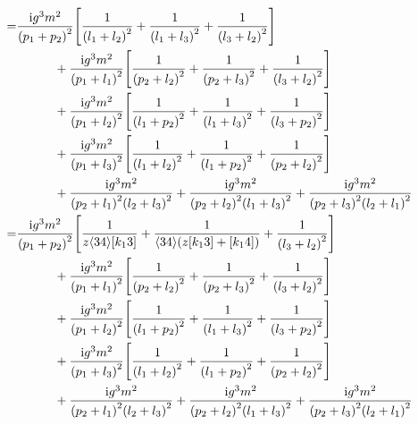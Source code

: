 \begin{align*}
    =&\frac{ \textnormal{i} g^3m^2}{\qty(p_1+p_2)^2}\qty[ \frac{1}{\qty(l_1+l_2)^2}+\frac{1}{\qty(l_1+l_3)^2}+\frac{1}{\qty(l_3+l_2)^2}]\\
    &\quad\quad\quad+\frac{ \textnormal{i} g^3m^2}{\qty(p_1+l_1)^2}\qty[ \frac{1}{\qty(p_2+l_2)^2}+\frac{1}{\qty(p_2+l_3)^2}+\frac{1}{\qty(l_3+l_2)^2}]\\
    &\quad\quad\quad+\frac{ \textnormal{i} g^3m^2}{\qty(p_1+l_2)^2}\qty[ \frac{1}{\qty(l_1+p_2)^2}+\frac{1}{\qty(l_1+l_3)^2}+\frac{1}{\qty(l_3+p_2)^2}]\\
    &\quad\quad\quad+\frac{ \textnormal{i} g^3m^2}{\qty(p_1+l_3)^2}\qty[ \frac{1}{\qty(l_1+l_2)^2}+\frac{1}{\qty(l_1+p_2)^2}+\frac{1}{\qty(p_2+l_2)^2}]\\
    &\quad\quad\quad+ \frac{\textnormal{i} g^3m^2}{\qty(p_2+l_1)^2\qty(l_2+l_3)^2}+ \frac{\textnormal{i} g^3m^2}{\qty(p_2+l_2)^2\qty(l_1+l_3)^2}+ \frac{\textnormal{i} g^3m^2}{\qty(p_2+l_3)^2\qty(l_2+l_1)^2}\\
    =&\frac{ \textnormal{i} g^3m^2}{\qty(p_1+p_2)^2}\qty[ \frac{1}{z\langle34\rangle[k_13]}+\frac{1}{\langle34\rangle(z[k_13]+[k_14])}+\frac{1}{\qty(l_3+l_2)^2}]\\
    &\quad\quad\quad+\frac{ \textnormal{i} g^3m^2}{\qty(p_1+l_1)^2}\qty[ \frac{1}{\qty(p_2+l_2)^2}+\frac{1}{\qty(p_2+l_3)^2}+\frac{1}{\qty(l_3+l_2)^2}]\\
    &\quad\quad\quad+\frac{ \textnormal{i} g^3m^2}{\qty(p_1+l_2)^2}\qty[ \frac{1}{\qty(l_1+p_2)^2}+\frac{1}{\qty(l_1+l_3)^2}+\frac{1}{\qty(l_3+p_2)^2}]\\
    &\quad\quad\quad+\frac{ \textnormal{i} g^3m^2}{\qty(p_1+l_3)^2}\qty[ \frac{1}{\qty(l_1+l_2)^2}+\frac{1}{\qty(l_1+p_2)^2}+\frac{1}{\qty(p_2+l_2)^2}]\\
    &\quad\quad\quad+ \frac{\textnormal{i} g^3m^2}{\qty(p_2+l_1)^2\qty(l_2+l_3)^2}+ \frac{\textnormal{i} g^3m^2}{\qty(p_2+l_2)^2\qty(l_1+l_3)^2}+ \frac{\textnormal{i} g^3m^2}{\qty(p_2+l_3)^2\qty(l_2+l_1)^2}
\end{align*}

